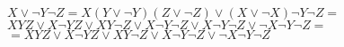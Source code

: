 \documentclass[preview]{standalone}
\begin{document}
\begin{center}
${X\vee \neg Y\neg Z=X(Y\vee \neg Y)(Z\vee \neg Z)\vee (X\vee \neg X)\neg Y\neg Z=}$ \\ ${XYZ\vee X\neg YZ\vee XY\neg Z\vee X\neg Y\neg Z\vee X\neg Y\neg Z\vee \neg X\neg Y\neg Z=}$ \\ ${=XYZ\vee X\neg YZ\vee XY\neg Z\vee X\neg Y\neg Z\vee \neg X\neg Y\neg Z}$
\end{center}
\end{document}
